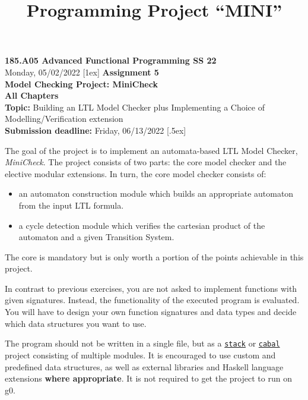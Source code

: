 \documentclass{article}
\title{Programming Project ``MINI''}
\begin{document}
\large
\thispagestyle{empty}
\begin{center}
  {\Large \textbf{185.A05 Advanced Functional Programming SS 22}}  \\ [1ex] 
            Monday, 05/02/2022  [1ex] 
               {\Large \textbf{Assignment 5}} \\[.5ex]
              {\Large \textbf{Model Checking Project: MiniCheck}} \\[.5ex]
                 \textbf{All Chapters}  \\ [.75ex]
           \textbf{Topic:} Building an LTL Model Checker plus Implementing a Choice of Modelling/Verification extension  \\[1ex]
          \textbf{Submission deadline:} Friday, 06/13/2022  [.5ex]
\end{center}

\vspace{1ex}
\noindent
\noindent





\newcommand{\code}[1]{\texttt{#1}}

\noindent
The goal of the project is to implement an automata-based LTL Model Checker, \textit{MiniCheck}. 
The project consists of two parts: the core model checker and the elective modular extensions. 
In turn, the core model checker consists of: 
\begin{itemize}
    \item an automaton construction module which builds an appropriate automaton from the input LTL formula.
    \item a cycle detection module which verifies the cartesian product of the automaton and a given Transition System.
\end{itemize}  
The core is mandatory but is only worth a portion of the points achievable in this project.

In contrast to previous exercises, you are not asked to implement functions with given signatures. 
Instead, the functionality of the executed program is evaluated. 
You will have to design your own function signatures and data types and decide 
which data structures you want to use.

The program should not be written in a single file, but as a \href{https://docs.haskellstack.org/en/stable/README/}{\code{stack}} 
or \href{https://cabal.readthedocs.io/en/3.4/}{\code{cabal}} project consisting of multiple modules. 
It is encouraged to use custom and predefined data structures, as well as external libraries 
and Haskell language extensions \textbf{where appropriate}. It is not required to get the project to run on g0.
\end{document}
